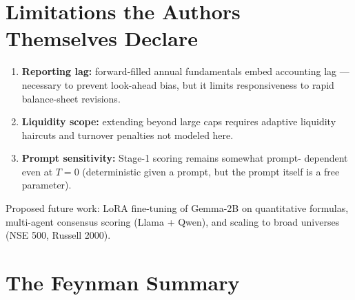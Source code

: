 \documentclass[11pt,a4paper]{article}
\begin{document}
\section{Limitations the Authors Themselves Declare}
\label{sec:limits}

\begin{enumerate}
  \item \textbf{Reporting lag:} forward-filled annual fundamentals embed
  accounting lag --- necessary to prevent look-ahead bias, but it limits
  responsiveness to rapid balance-sheet revisions.
  \item \textbf{Liquidity scope:} extending beyond large caps requires
  adaptive liquidity haircuts and turnover penalties not modeled here.
  \item \textbf{Prompt sensitivity:} Stage-1 scoring remains somewhat prompt-
  dependent even at $T=0$ (deterministic given a prompt, but the prompt itself
  is a free parameter).
\end{enumerate}

Proposed future work: LoRA fine-tuning of Gemma-2B on quantitative formulas,
multi-agent consensus scoring (Llama + Qwen), and scaling to broad universes
(NSE 500, Russell 2000).

\section{The Feynman Summary}
\label{sec:summary}
\end{document}
